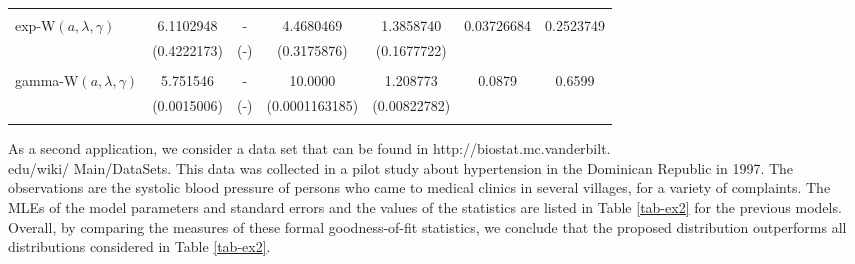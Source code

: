 \documentclass[12pt,a4paper]{article} %
\begin{document}
\begin{table}[!htb]
\begin{tabular}{lcccccc}
 & & & & &  \\
exp-W$(a,\lambda,\gamma)$   &    6.1102948   & - &   4.4680469 &  1.3858740 &   0.03726684   & 0.2523749 \\
&   (0.4222173) & (-) & (0.3175876) & (0.1677722)   &  & \\

 & & & & &  \\
 gamma-W$(a,\lambda,\gamma)$    & 5.751546  & - &  10.0000 & 1.208773&  0.0879 & 0.6599  \\ 
&  (0.0015006)&  (-)&  (0.0001163185) &(0.00822782)    &  & \\

 & & & & &  \\





                                                     \hline
\end{tabular}
\end{table}



As a second application, we consider a data set that can be found in http://biostat.mc.vanderbilt.\\
edu/wiki/
Main/DataSets. This data was collected in a pilot study about hypertension in the Dominican Republic
in 1997. The observations are the systolic blood pressure of persons who came to medical clinics in
several villages, for a variety of complaints. The MLEs of the model parameters and standard errors
and the values of the statistics are listed in Table \ref{tab-ex2} for the previous models. Overall, by
comparing the measures of these formal goodness-of-fit statistics, we conclude that the proposed distribution
outperforms all distributions considered in Table \ref{tab-ex2}.
\end{document}
